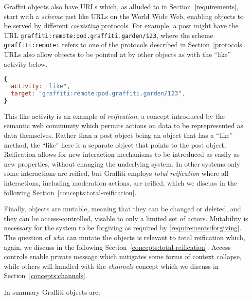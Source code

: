 Graffiti objects also have URLs which,
as alluded to in Section~\ref{requirements},
start with a \emph{scheme} just like URLs on the World Wide Web,
enabling objects to be served by different \emph{coexisting} protocols.
For example, a post might have the URL \texttt{graffiti:remote:pod.graffiti.garden/123},
where the scheme \texttt{graffiti:remote:} refers to one of the protocols described in Section~\ref{protocols}.
URLs also allow objects to be pointed at by other objects as with the
``like'' activity below.

\begin{lstlisting}[language=javascript]
{
  activity: "like",
  target: "graffiti:remote:pod.graffiti.garden/123",
}
\end{lstlisting}

This like activity is an example of \emph{reification},
a concept introduced by the semantic web community
which permits actions on data to be reprepresented as data themselves.
Rather than a post object being an object that has a ``like'' method,
the ``like'' here is a separate object that points to the post object.
Reification allows for new interaction mechanisms to be introduced as easily as new properties,
without changing the underlying system.
In other systems only some interactions are reified,
but Graffiti employs \emph{total reification} where
all interactions, including moderation actions, are reified,
which we discuss in the following
Section~\ref{concepts:total-reification}.


Finally, objects are mutable, meaning that they can be changed or deleted,
and they can be access-controlled, visable to only a limited set of actors.
Mutability is necessary for the system to be forgiving as required by \ref{requirements:forgiving}.
The question of \emph{who} can mutate the objects is relevant to
total reification which,
again, we discuss in the following
Section~\ref{concepts:total-reification}.
Access controls enable private message which mitigates some forms of context collapse,
while others will handled with the \emph{channels} concept
which we discuss in Section~\ref{concepts:channels}.

In summary Graffiti objects are:

